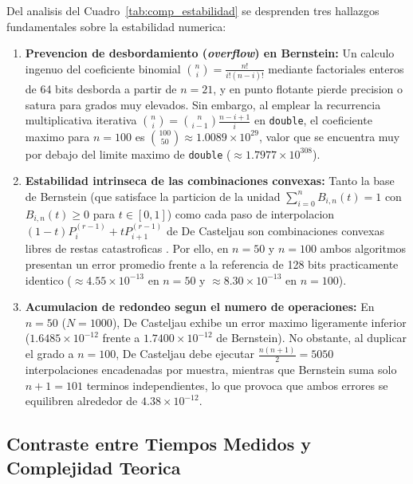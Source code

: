 
Del analisis del Cuadro~\ref{tab:comp_estabilidad} se desprenden tres hallazgos fundamentales sobre la estabilidad numerica:

\begin{enumerate}
    \item \textbf{Prevencion de desbordamiento (\textit{overflow}) en Bernstein:} Un calculo ingenuo del coeficiente binomial $\binom{n}{i} = \frac{n!}{i!(n-i)!}$ mediante factoriales enteros de 64 bits desborda a partir de $n = 21$, y en punto flotante pierde precision o satura para grados muy elevados. Sin embargo, al emplear la recurrencia multiplicativa iterativa $\binom{n}{i} = \binom{n}{i-1} \frac{n - i + 1}{i}$ en \texttt{double}, el coeficiente maximo para $n = 100$ es $\binom{100}{50} \approx 1.0089 \times 10^{29}$, valor que se encuentra muy por debajo del limite maximo de \texttt{double} ($\approx 1.7977 \times 10^{308}$).
    \item \textbf{Estabilidad intrinseca de las combinaciones convexas:} Tanto la base de Bernstein (que satisface la particion de la unidad $\sum_{i=0}^n B_{i,n}(t) = 1$ con $B_{i,n}(t) \ge 0$ para $t \in [0,1]$) como cada paso de interpolacion $(1-t)P_i^{(r-1)} + t P_{i+1}^{(r-1)}$ de De Casteljau son combinaciones convexas libres de restas catastroficas \cite{farouki1987}. Por ello, en $n = 50$ y $n = 100$ ambos algoritmos presentan un error promedio frente a la referencia de 128 bits practicamente identico ($\approx 4.55 \times 10^{-13}$ en $n = 50$ y $\approx 8.30 \times 10^{-13}$ en $n = 100$).
    \item \textbf{Acumulacion de redondeo segun el numero de operaciones:} En $n = 50$ ($N = 1000$), De Casteljau exhibe un error maximo ligeramente inferior ($1.6485 \times 10^{-12}$ frente a $1.7400 \times 10^{-12}$ de Bernstein). No obstante, al duplicar el grado a $n = 100$, De Casteljau debe ejecutar $\frac{n(n+1)}{2} = 5050$ interpolaciones encadenadas por muestra, mientras que Bernstein suma solo $n + 1 = 101$ terminos independientes, lo que provoca que ambos errores se equilibren alrededor de $4.38 \times 10^{-12}$.
\end{enumerate}

\subsection{Contraste entre Tiempos Medidos y Complejidad Teorica}
\label{subsec:comp_complejidad}

